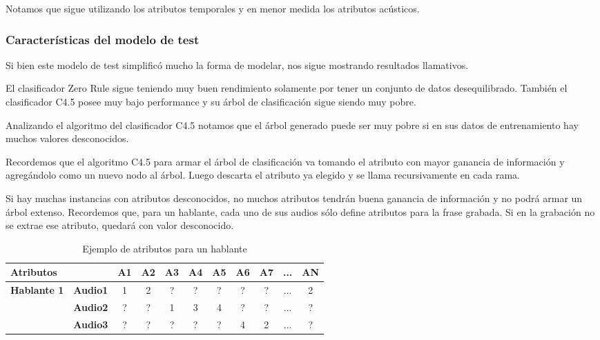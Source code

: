 Notamos que sigue utilizando los atributos temporales y en menor medida los atributos acústicos.


\subsubsection{Características del modelo de test}

Si bien este modelo de test simplificó mucho la forma de modelar, nos sigue mostrando resultados llamativos. 

El clasificador Zero Rule sigue teniendo muy buen rendimiento solamente por tener un conjunto de datos desequilibrado. También el clasificador C4.5 posee muy bajo performance y su árbol de clasificación sigue siendo muy pobre.  

Analizando el algoritmo del clasificador C4.5 notamos que el árbol generado puede ser muy pobre si en sus datos de entrenamiento hay muchos valores desconocidos. 

Recordemos que el algoritmo C4.5 para armar el árbol de clasificación va tomando el atributo con mayor ganancia de información y agregándolo como un nuevo nodo al árbol. Luego descarta el atributo ya elegido y se llama recursivamente en cada rama. 

Si hay muchas instancias con atributos desconocidos, no muchos atributos tendrán buena ganancia de información y no podrá armar un árbol extenso. Recordemos que, para un hablante, cada uno de sus audios sólo define atributos para la frase grabada. Si en la grabación no se extrae ese atributo, quedará con valor desconocido. 

\begin{table}[H]
	\centering
	\begin{tabular}{|l|l|ccccccccc|}
		\hline
		\multicolumn{2}{|l|}{Atributos} & A1 & A2 & A3 & A4 & A5 & A6 & A7 & ... & AN \\
		\hline 
		\textbf{Hablante 1} & \textbf{Audio1} & 1 & 2 & ? & ? & ? & ? & ? & ... & 2 \\
		& \textbf{Audio2} & ? & ? & 1 & 3 & 4 & ? & ? & ... & ? \\
		& \textbf{Audio3} & ? & ? & ? & ? & ? & 4 & 2 &  ... & ? \\
		\hline
	\end{tabular}
	\caption{Ejemplo de atributos para un hablante}
	\label{hablante_ej}
\end{table}

